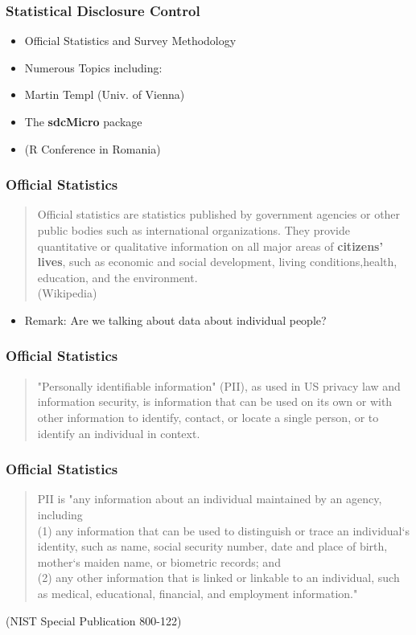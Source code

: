 \documentclass{beamer}
\begin{document}
\begin{frame}
	\frametitle{Statistical Disclosure Control}
	\begin{itemize}
		\item Official Statistics and Survey Methodology
		\item Numerous Topics including:
		\item Martin Templ (Univ. of Vienna)
		\item The \textbf{sdcMicro} package
		\item (R Conference in Romania)
	\end{itemize}
\end{frame}

\begin{frame}
	\frametitle{Official Statistics}
	\begin{quotation}
		\noindent Official statistics are statistics published by government agencies or other public bodies such as international organizations. They provide quantitative or qualitative information on all major areas of \textbf{citizens' lives}, such as economic and social development, living conditions,health, education, and the environment.\\ (Wikipedia)
	\end{quotation}
	
	\begin{itemize}
		\item Remark: Are we talking about data about individual people?
	\end{itemize}
\end{frame}
\begin{frame}
	\frametitle{Official Statistics}
	\begin{quotation}
		"Personally identifiable information" (PII), as used in US privacy law and information security, is information that can be used on its own or with other information to identify, contact, or locate a single person, or to identify an individual in context. 
	\end{quotation}
\end{frame}
\begin{frame}
	\frametitle{Official Statistics}
	\begin{quotation}
		\noindent  PII is "any information about an individual maintained by an agency, including \\ (1) any information that can be used to distinguish or trace an individual‘s identity, such as name, social security number, date and place of birth, mother‘s maiden name, or biometric records; and \\ (2) any other information that is linked or linkable to an individual, such as medical, educational, financial, and employment information."
	\end{quotation}
	(NIST Special Publication 800-122)
\end{frame}
\end{document}
